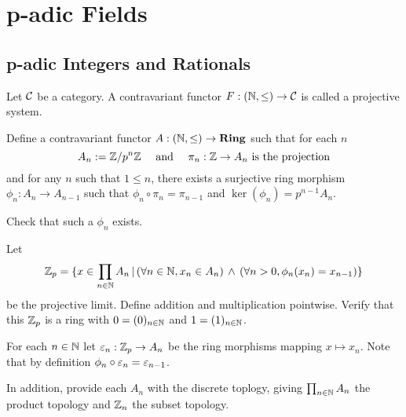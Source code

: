 \chapter{p-adic Fields}
\section{p-adic Integers and Rationals}
\begin{dfn}
    Let $\mathcal{C}$ be a category.
    A contravariant functor $F : (\mathbb{N},\le) \to \mathcal{C}$ 
    is called a projective system.
\end{dfn}

\begin{dfn}
    Define a contravariant functor $A : (\mathbb{N},\le) \to \mathbf{Ring}$ 
    such that for each $n$
    \[A_n := \mathbb{Z} / p^n \mathbb{Z} \quad \text{ and } 
    \quad \pi_n : \mathbb{Z} \to A_n \text{ is the projection}\]
    and for any $n$ such that $1 \le n$, 
    there exists a surjective ring morphism 
    $\phi_n : A_n \to A_{n-1}$ such that
    $\phi_n \circ \pi_n = \pi_{n-1}$ and 
    $\ker(\phi_n) = p^{n-1} A_n$.
\end{dfn}
\begin{ex}
    Check that such a $\phi_n$ exists.
\end{ex}

\begin{dfn}
    Let 
    \[\mathbb{Z}_p = \{x \in \prod_{n \in \mathbb{N}} A_n \,|\, 
    (\forall n \in \mathbb{N}, x_n \in A_n) \, \land \,
    (\forall n > 0, \phi_n(x_n) = x_{n-1})\}\]
    be the projective limit.
    Define addition and multiplication pointwise. 
    Verify that this $\mathbb{Z}_p$ is a ring with $0 = (0)_{n \in \mathbb{N}}$
    and $1 = (1)_{n \in \mathbb{N}}$.

    For each $n \in \mathbb{N}$ let $\varepsilon_n : \mathbb{Z}_p \to A_n$ be the 
    ring morphisms mapping $x \mapsto x_n$.
    Note that by definition $\phi_n \circ \varepsilon_n = \varepsilon_{n-1}$.

    In addition,
    provide each $A_n$  with the discrete toplogy,
    giving $\prod_{n \in \mathbb{N}} A_n$ the product topology
    and $\mathbb{Z}_n$ the subset topology.
\end{dfn}

